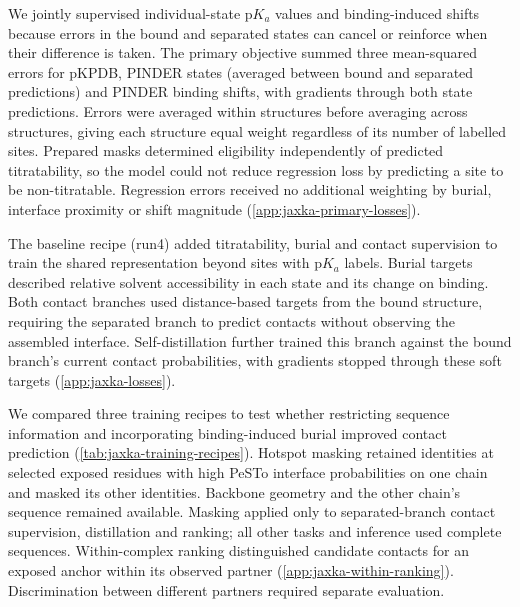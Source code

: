 We jointly supervised individual-state $\mathrm{p}K_a$ values and binding-induced shifts because errors in the bound and separated states can cancel or reinforce when their difference is taken. The primary objective summed three mean-squared errors for pKPDB, PINDER states (averaged between bound and separated predictions) and PINDER binding shifts, with gradients through both state predictions. Errors were averaged within structures before averaging across structures, giving each structure equal weight regardless of its number of labelled sites. Prepared masks determined eligibility independently of predicted titratability, so the model could not reduce regression loss by predicting a site to be non-titratable. Regression errors received no additional weighting by burial, interface proximity or shift magnitude (\cref{app:jaxka-primary-losses}).

The baseline recipe (run4) added titratability, burial and contact supervision to train the shared representation beyond sites with $\mathrm{p}K_a$ labels. Burial targets described relative solvent accessibility in each state and its change on binding. Both contact branches used distance-based targets from the bound structure, requiring the separated branch to predict contacts without observing the assembled interface. Self-distillation further trained this branch against the bound branch's current contact probabilities, with gradients stopped through these soft targets (\cref{app:jaxka-losses}).

We compared three training recipes to test whether restricting sequence information and incorporating binding-induced burial improved contact prediction (\cref{tab:jaxka-training-recipes}). Hotspot masking retained identities at selected exposed residues with high PeSTo interface probabilities on one chain and masked its other identities.\supercite{krappPeSToParameterfreeGeometric2023} Backbone geometry and the other chain's sequence remained available. Masking applied only to separated-branch contact supervision, distillation and ranking; all other tasks and inference used complete sequences. Within-complex ranking distinguished candidate contacts for an exposed anchor within its observed partner (\cref{app:jaxka-within-ranking}). Discrimination between different partners required separate evaluation.


